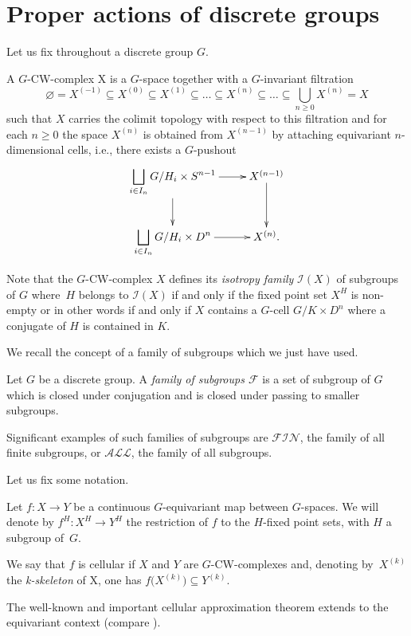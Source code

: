 \documentclass[11pt]{article}
\numberwithin{equation}{section}
\numberwithin{equation}{section}
\begin{document}
\section{Proper actions of discrete groups}

Let us fix throughout a discrete group $G$.

\begin{Definition}
	A $G$-CW-complex X is a $G$-space together
	with a $G$-invariant filtration
	\[
\varnothing = X^{(-1)}\subseteq X^{(0)} \subseteq X^{(1)} \subseteq \dots \subseteq X^{(n)}\subseteq \dots \subseteq\bigcup_{n\geq0}X^{(n)}=X
\]
	such that $X$ carries the colimit topology with respect to this filtration and for each $n\geq0$
	the space $X^{(n)}$ is obtained from $X^{(n-1)}$ by attaching equivariant $n$-dimensional
	cells, i.e., there exists a $G$-pushout
	\[
	\xymatrix{\displaystyle\bigsqcup_{i\in I_n}G/H_i\times S^{n-1}\ar[r]\ar[d]& X^{(n-1)}\ar[d]\\
		\displaystyle\bigsqcup_{i\in I_n}G/H_i\times D^n\ar[r]& X^{(n)}.}
	\]
	
	Note that the $G$-CW-complex $X$ defines its \emph{isotropy family}
	$\mathcal{I}(X)$ of subgroups of $G$ where~$H$ belongs to $\mathcal{I}(X)$ if and
	only if the fixed point set $X^H$ is non-empty or in other words if and only
	if $X$ contains a $G$-cell $G/K\times D^n$ where a conjugate of $H$ is
	contained in $K$.
\end{Definition}

We recall the concept of a family of subgroups which we just have used.

\begin{Definition}
	Let $G$ be a discrete group. A \emph{family of subgroups $\mathcal{F}$} is a
	set of subgroup of $G$ which is closed under conjugation and is closed under passing
	to smaller subgroups.
	
	Significant examples of such families of subgroups are $\mathcal{FIN}$, the family of all finite subgroups, or
	$\mathcal{ALL}$, the family of all subgroups.
\end{Definition}


Let us fix some notation.
\begin{Definition}
	Let $f\colon X \rightarrow Y$ be a continuous $G$-equivariant map between
	$G$-spaces. We will denote by $f^H\colon X^H\to Y^H$ the restriction of $f$
	to the $H$-fixed point sets, with $H$ a subgroup of~$G$.
\end{Definition}

\begin{Definition}
	We say that $f$ is cellular if $X$ and $Y$ are $G$-CW-complexes and, denoting by~$X^{(k)}$ the \textit{k-skeleton} of X, one has $f\bigl(X^{(k)}\bigr) \subseteq Y^{(k)}$.
\end{Definition}
The well-known and important cellular approximation theorem extends to the equivariant context (compare \cite[Theorem~2.1]{ttd}).
\end{document}
